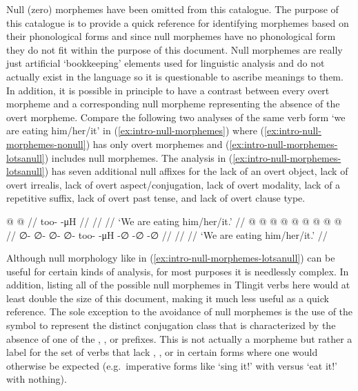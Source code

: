 Null (zero) morphemes have been omitted from this catalogue.
The purpose of this catalogue is to provide a quick reference for identifying morphemes based on their phonological forms and since null morphemes have no phonological form they do not fit within the purpose of this document.
Null morphemes are really just artificial ‘bookkeeping’ elements used for linguistic analysis and do not actually exist in the language so it is questionable to ascribe meanings to them.
In addition, it is possible in principle to have a contrast between every overt morpheme and a corresponding null morpheme representing the absence of the overt morpheme.
Compare the following two analyses of the same verb form  ‘we are eating him/her/it’ in (\ref{ex:intro-null-morphemes}) where (\ref{ex:intro-null-morphemes-nonull}) has only overt morphemes and (\ref{ex:intro-null-morphemes-lotsanull}) includes null morphemes.
The analysis in (\ref{ex:intro-null-morphemes-lotsanull}) has seven additional null affixes for the lack of an overt object, lack of overt irrealis, lack of overt aspect/conjugation, lack of overt modality, lack of a repetitive suffix, lack of overt past tense, and lack of overt clause type.

\pex\label{ex:intro-null-morphemes}%
\a\label{ex:intro-null-morphemes-nonull}%
\begingl
	\gla	{} @ {} @ {} //
	\glb	too-  -μH //
	\glc	{}\·  \· //
	\gld	{} {} {} //
	\glft	‘We are eating him/her/it.’
		//
\endgl
\a\label{ex:intro-null-morphemes-lotsanull}%
\begingl
	\gla	{} @ {} @ {} @ {} @ {} @ {} @ {} @ {} @ {} @ {} //
	\glb	∅- ∅- ∅- ∅- too-  -μH -∅ -∅ -∅ //
	\glc	{}\· \· \· \· \·
		 \· \· \· \· //
	\gld	{} {} {} {} {} {} {} {} {} {} //
	\glft	‘We are eating him/her/it.’
		//
\endgl
\xe

Although null morphology like in (\ref{ex:intro-null-morphemes-lotsanull}) can be useful for certain kinds of analysis, for most purposes it is needlessly complex.
In addition, listing all of the possible null morphemes in Tlingit verbs here would at least double the size of this document, making it much less useful as a quick reference.
The sole exception to the avoidance of null morphemes is the use of the symbol  to represent the distinct conjugation class that is characterized by the absence of one of the , , or  prefixes.
This  is not actually a morpheme but rather a label for the set of verbs that lack , , or  in certain forms where one would otherwise be expected (e.g.\ imperative forms like  ‘sing it!’
 with  versus  ‘eat it!’ with nothing).

